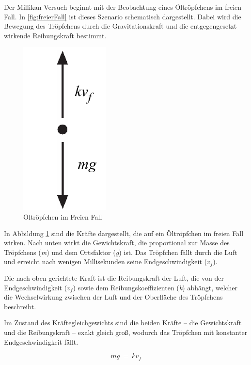 \noindent Der Millikan-Versuch beginnt mit der Beobachtung eines Öltröpfchens im freien Fall. In \autoref{fig:freierFall} ist dieses Szenario schematisch dargestellt. Dabei wird die Bewegung des Tröpfchens durch die Gravitationskraft und die entgegengesetzt wirkende Reibungskraft bestimmt.

\begin{figure}[h]
	\begin{center}
		\includegraphics[scale=0.5]{bilder/pdf/Abbildung1_FreierFall.pdf}
		\caption{Öltröpfchen im Freien Fall}
		\label{fig:freierFall}
	\end{center}
\end{figure}

\noindent In Abbildung \ref{fig:freierFall} sind die Kräfte dargestellt, die auf ein Öltröpfchen im freien Fall wirken. Nach unten wirkt die Gewichtskraft, die proportional zur Masse des Tröpfchens (\textit{m}) und dem Ortsfaktor (\textit{g}) ist. Das Tröpfchen fällt durch die Luft und erreicht nach wenigen Millisekunden seine Endgeschwindigkeit (\textit{$v_f$}).

Die nach oben gerichtete Kraft ist die Reibungskraft der Luft, die von der Endgeschwindigkeit (\textit{$v_f$}) sowie dem Reibungskoeffizienten (\textit{k}) abhängt, welcher die Wechselwirkung zwischen der Luft und der Oberfläche des Tröpfchens beschreibt.

Im Zustand des Kräftegleichgewichts sind die beiden Kräfte – die Gewichtskraft und die Reibungskraft – exakt gleich groß, wodurch das Tröpfchen mit konstanter Endgeschwindigkeit fällt.

\begin{equation}\label{eq:kräfteFreierFall}
	mg \ = \ kv_f
\end{equation}   


